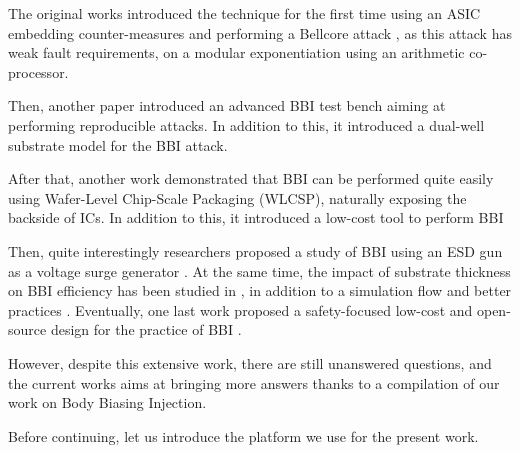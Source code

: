 		The original works \cite{bbiOrigin, bbiSecond} introduced the technique for the first time using an ASIC embedding counter-measures and performing a Bellcore attack \cite{bellcore}, as this attack has weak fault requirements, on a modular exponentiation using an arithmetic co-processor.
		
		Then, another paper \cite{bbiThird} introduced an advanced BBI test bench aiming at performing reproducible attacks.
		In addition to this, it introduced a dual-well substrate model for the BBI attack.
		
		After that, another work \cite{bbiColin} demonstrated that BBI can be performed quite easily using Wafer-Level Chip-Scale Packaging (WLCSP), naturally exposing the backside of ICs.
		In addition to this, it introduced a low-cost tool to perform BBI
		
		Then, quite interestingly researchers proposed a study of BBI using an ESD gun as a voltage surge generator \cite{japbbi, japbbi2}.
		At the same time, the impact of substrate thickness on BBI efficiency has been studied in \cite{mybbiCosade}, in addition to a simulation flow and better practices \cite{mybbiFdtc2022,mybbifdtc2023}.
		Eventually, one last work proposed a safety-focused low-cost and open-source design for the practice of BBI \cite{colinFdtc2023}.

		However, despite this extensive work, there are still unanswered questions, and the current works aims at bringing more answers thanks to a compilation of our work on Body Biasing Injection.

		Before continuing, let us introduce the platform we use for the present work.

